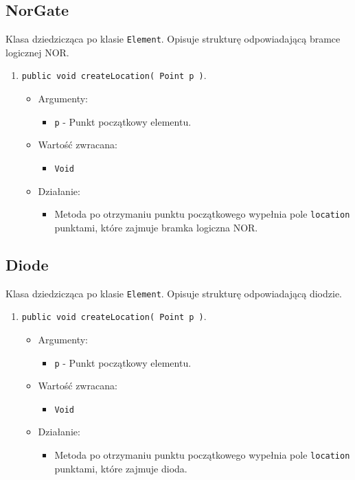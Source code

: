 \documentclass[a4paper,11pt, notitlepage ]{article}
\begin{document}
\subsection{NorGate}
Klasa dziedzicząca po klasie \verb+Element+. Opisuje strukturę odpowiadającą bramce logicznej NOR.

\begin{enumerate}
\item \verb+public void createLocation( Point p )+.
\begin{itemize}
\item Argumenty:
\begin{itemize}
\item \verb+p+ - Punkt początkowy elementu.
\end{itemize}
\item Wartość zwracana:
\begin{itemize}
\item \verb+Void+
\end{itemize}
\item Działanie:
\begin{itemize}
\item Metoda po otrzymaniu punktu początkowego wypełnia pole \verb+location+ punktami, które zajmuje bramka logiczna NOR.
\end{itemize}
\end{itemize}
\end{enumerate}

\subsection{Diode}
Klasa dziedzicząca po klasie \verb+Element+. Opisuje strukturę odpowiadającą diodzie.

\begin{enumerate}
\item \verb+public void createLocation( Point p )+.
\begin{itemize}
\item Argumenty:
\begin{itemize}
\item \verb+p+ - Punkt początkowy elementu.
\end{itemize}
\item Wartość zwracana:
\begin{itemize}
\item \verb+Void+
\end{itemize}
\item Działanie:
\begin{itemize}
\item Metoda po otrzymaniu punktu początkowego wypełnia pole \verb+location+ punktami, które zajmuje dioda.
\end{itemize}
\end{itemize}
\end{enumerate}
\end{document}
